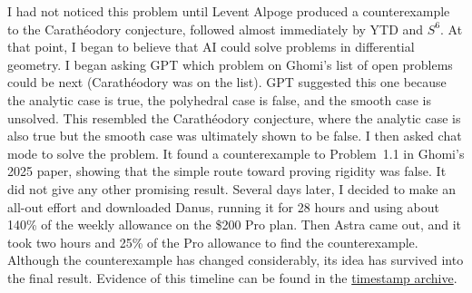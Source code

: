 I had not noticed this problem until Levent Alpoge produced a
counterexample to the Carath\'eodory conjecture, followed almost immediately
by YTD and $S^6$. At that point, I began to believe that AI could solve
problems in differential geometry. I began asking GPT which problem on
Ghomi's list of open problems could be next (Carath\'eodory was on the
list). GPT suggested this one because the analytic case is true, the
polyhedral case is false, and the smooth case is unsolved. This resembled
the Carath\'eodory conjecture, where the analytic case is also true but the
smooth case was ultimately shown to be false. I then asked chat mode to
solve the problem. It found a counterexample to Problem~1.1 in Ghomi's
2025 paper, showing that the simple route toward proving rigidity was
false. It did not give any other promising result. Several days later,
I decided to make an all-out effort and downloaded Danus, running it for
28 hours and using about 140\% of the weekly allowance on the \$200 Pro
plan. Then Astra came out, and it took two hours and 25\% of the Pro
allowance to find the counterexample. Although the counterexample has
changed considerably, its idea has survived into the final result.
Evidence of this timeline can be found in the
\href{https://github.com/zhangyuetong/smooth-tight-nonrigidity/blob/6a0758c99077e2c7fd31c3de6ee3452b3f6df8d3/timestamp/README.md}{timestamp archive}.

